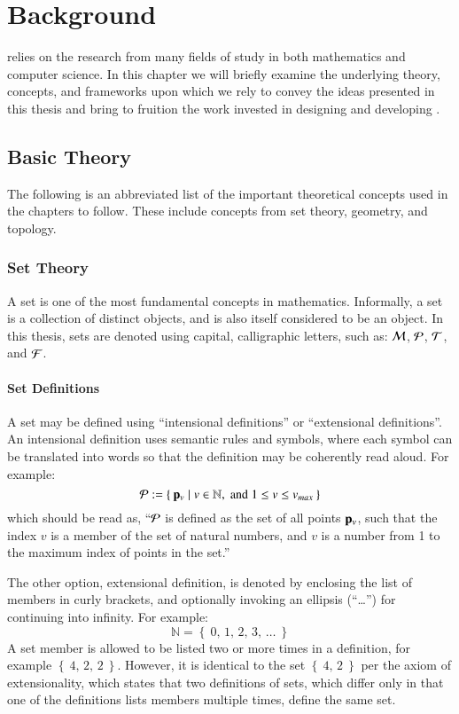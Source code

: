 \chapter{Background}
\label{ch2}
 relies on the research from many fields of study in both mathematics and computer science. In this chapter we will briefly examine the underlying theory, concepts, and frameworks upon which we rely to convey the ideas presented in this thesis and bring to fruition the work invested in designing and developing .
%
%
%
%
%
\section{Basic Theory}
The following is an abbreviated list of the important theoretical concepts used in the chapters to follow. These include concepts from set theory, geometry, and topology.
%
\subsection{Set Theory}
A set is one of the most fundamental concepts in mathematics. Informally, a set is a collection of distinct objects, and is also itself considered to be an object. In this thesis, sets are denoted using capital, calligraphic letters, such as: $\mathcal{M}$, $\mathcal{P}$, $\mathcal{T}$, and $\mathcal{F}$. 
%
\subsubsection{Set Definitions}
A set may be defined using ``intensional definitions'' or ``extensional definitions''. An intensional definition uses semantic rules and symbols, where each symbol can be translated into words so that the definition may be coherently read aloud. For example:
\begin{equation}
	\mathcal{P} := \left \{\:\mathbf{p}_v \mid v \in \mathbb{N}, \;\text{and}\; 1\leq v \leq v_{max}\:\right \}
\end{equation}
which should be read as, ``$\mathcal{P}$ is defined as the set of all points $\mathbf{p}_v$, such that the index $v$ is a member of the set of natural numbers, and $v$ is a number from 1 to the maximum index of points in the set.''

The other option, extensional definition, is denoted by enclosing the list of members in curly brackets, and optionally invoking an ellipsis (``\dots'') for continuing into infinity. For example:
%
\begin{equation}
	\mathbb{N} = \left \{\:0,\,1,\,2,\,3,\,\ldots\:\right \}
\end{equation}
%
A set member is allowed to be listed two or more times in a definition, for example $\left \{\:4,\,2,\,2\:\right \}$. However, it is identical to the set $\left \{\:4,\,2\:\right \}$ per the axiom of extensionality, which states that two definitions of sets, which differ only in that one of the definitions lists members multiple times, define the same set.
%
